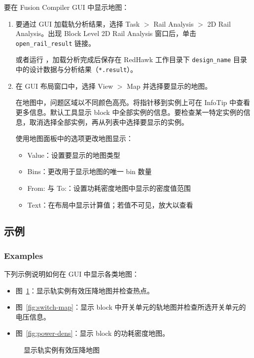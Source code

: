 要在 Fusion Compiler GUI 中显示地图：
\begin{enumerate}
  \item 要通过 GUI 加载轨分析结果，选择 Task $>$ Rail Analysis $>$ 2D Rail Analysis。出现 Block Level 2D Rail Analysis 窗口后，单击 \texttt{open\_rail\_result} 链接。

或者运行 ，加载分析完成后保存在 RedHawk 工作目录下 \texttt{design\_name} 目录中的设计数据与分析结果（\texttt{*.result}）。
  \item 在 GUI 布局窗口中，选择 View $>$ Map 并选择要显示的地图。

在地图中，问题区域以不同颜色高亮。将指针移到实例上可在 InfoTip 中查看更多信息。默认工具显示 block 中全部实例的信息。要检查某一特定实例的信息，取消选择全部实例，再从列表中选择要显示的实例。

使用地图面板中的选项更改地图显示：
    \begin{itemize}
      \item Value：设置要显示的地图类型
      \item Bins：更改用于显示地图的唯一 bin 数量
      \item From: 与 To:：设置功耗密度地图中显示的密度值范围
      \item Text：在布局中显示计算值；若值不可见，放大以查看
    \end{itemize}
\end{enumerate}

\subsection{示例}
\subsubsection*{Examples}

下列示例说明如何在 GUI 中显示各类地图：
\begin{itemize}
  \item 图~\ref{fig:eff-vd-map}：显示轨实例有效压降地图并检查热点。
  \item 图~\ref{fig:switch-map}：显示 block 中开关单元的轨地图并检查所选开关单元的电压信息。
  \item 图~\ref{fig:power-dens}：显示 block 的功耗密度地图。
\end{itemize}

\begin{figure}[htbp]
\centering
{}
\caption{显示轨实例有效压降地图}
\label{fig:eff-vd-map}
\end{figure}

